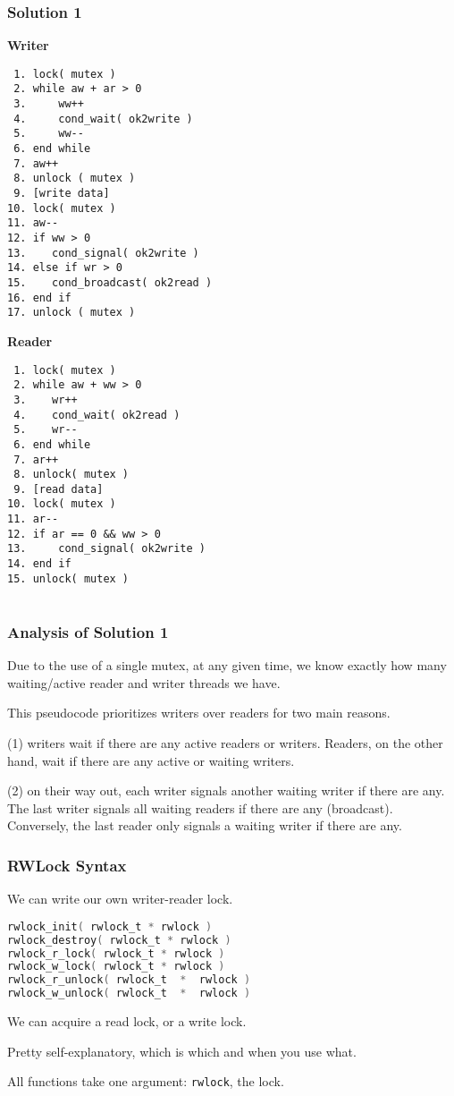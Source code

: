 \begin{frame}[fragile]
	\frametitle{Solution 1}

	\begin{multicols}{2}
		\small
		\textbf{Writer}
		\begin{verbatim}
 1. lock( mutex )
 2. while aw + ar > 0
 3.     ww++
 4.     cond_wait( ok2write )
 5.     ww--
 6. end while
 7. aw++
 8. unlock ( mutex )
 9. [write data]
10. lock( mutex )
11. aw--
12. if ww > 0
13.    cond_signal( ok2write )
14. else if wr > 0
15.    cond_broadcast( ok2read )
16. end if
17. unlock ( mutex )
		\end{verbatim}
		\columnbreak
		\textbf{Reader}
		\begin{verbatim}
 1. lock( mutex )
 2. while aw + ww > 0
 3.    wr++
 4.    cond_wait( ok2read )
 5.    wr--
 6. end while
 7. ar++
 8. unlock( mutex )
 9. [read data]
10. lock( mutex )
11. ar--
12. if ar == 0 && ww > 0
13.     cond_signal( ok2write )
14. end if
15. unlock( mutex )


		\end{verbatim}
	\end{multicols}
	\vspace{-2em}

\end{frame}


\begin{frame}[fragile]
	\frametitle{Analysis of Solution 1}
	Due to the use of a single mutex, at any given time, we know exactly how many waiting/active reader and writer threads we have.

	This pseudocode prioritizes writers over readers for two main reasons.

	(1) writers wait if there are any active readers or writers.
	Readers, on the other hand, wait if there are any active or waiting writers.


	(2) on their way out, each writer signals another waiting writer if there are any.
	The last writer signals all waiting readers if there are any (broadcast).
	Conversely, the last reader only signals a waiting writer if there are any.
\end{frame}

\begin{frame}[fragile]
	\frametitle{RWLock Syntax}

	We can write our own writer-reader lock.

	\begin{lstlisting}[language=C]
rwlock_init( rwlock_t * rwlock )
rwlock_destroy( rwlock_t * rwlock )
rwlock_r_lock( rwlock_t * rwlock )
rwlock_w_lock( rwlock_t * rwlock )
rwlock_r_unlock( rwlock_t  *  rwlock )
rwlock_w_unlock( rwlock_t  *  rwlock )
	\end{lstlisting}

	We can acquire a read lock, or a write lock.

	Pretty self-explanatory, which is which and when you use what.

	All functions take one argument: \texttt{rwlock}, the lock.
\end{frame}

